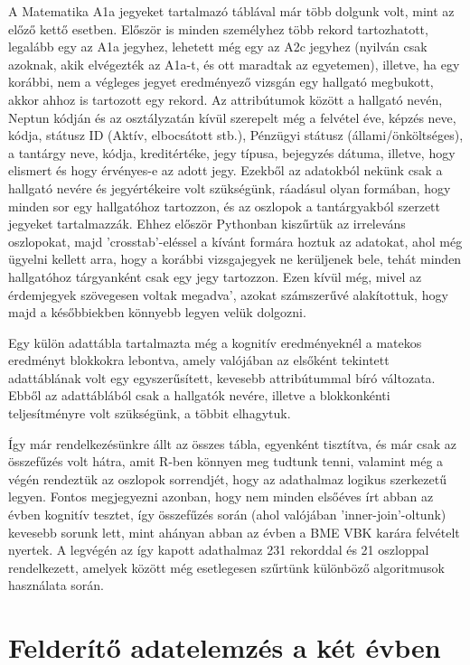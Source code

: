 \documentclass[12pt]{article}
\begin{document}
A Matematika A1a jegyeket tartalmazó táblával már több dolgunk volt, mint az előző kettő esetben. Először is minden személyhez több rekord tartozhatott, legalább egy az A1a jegyhez, lehetett még egy az A2c jegyhez (nyilván csak azoknak, akik elvégezték az A1a-t, és ott maradtak az egyetemen), illetve, ha egy korábbi, nem a végleges jegyet eredményező vizsgán egy hallgató megbukott, akkor ahhoz is tartozott egy rekord. Az attribútumok között a hallgató nevén, Neptun kódján és az osztályzatán kívül szerepelt még a felvétel éve, képzés neve, kódja, státusz ID (Aktív, elbocsátott stb.), Pénzügyi státusz (állami/önköltséges), a tantárgy neve, kódja, kreditértéke, jegy típusa, bejegyzés dátuma, illetve, hogy elismert és hogy érvényes-e az adott jegy. Ezekből az adatokból nekünk csak a hallgató nevére és jegyértékeire volt szükségünk, ráadásul olyan formában, hogy minden sor egy hallgatóhoz tartozzon, és az oszlopok a tantárgyakból szerzett jegyeket tartalmazzák. Ehhez először Pythonban kiszűrtük az irreleváns oszlopokat, majd ’crosstab’-eléssel a kívánt formára hoztuk az adatokat, ahol még ügyelni kellett arra, hogy a korábbi vizsgajegyek ne kerüljenek bele, tehát minden hallgatóhoz tárgyanként csak egy jegy tartozzon. Ezen kívül még, mivel az érdemjegyek szövegesen voltak megadva’, azokat számszerűvé alakítottuk, hogy majd a későbbiekben könnyebb legyen velük dolgozni.

Egy külön adattábla tartalmazta még a kognitív eredményeknél a matekos eredményt blokkokra lebontva, amely valójában az elsőként tekintett adattáblának volt egy egyszerűsített, kevesebb attribútummal bíró változata. Ebből az adattáblából csak a hallgatók nevére, illetve a blokkonkénti teljesítményre volt szükségünk, a többit elhagytuk.

Így már rendelkezésünkre állt az összes tábla, egyenként tisztítva, és már csak az összefűzés volt hátra, amit R-ben könnyen meg tudtunk tenni, valamint még a végén rendeztük az oszlopok sorrendjét, hogy az adathalmaz logikus szerkezetű legyen. Fontos megjegyezni azonban, hogy nem minden elsőéves írt abban az évben kognitív tesztet, így összefűzés során (ahol valójában ’inner-join’-oltunk) kevesebb sorunk lett, mint ahányan abban az évben a BME VBK karára felvételt nyertek.
A legvégén az így kapott adathalmaz 231 rekorddal és 21 oszloppal rendelkezett, amelyek között még esetlegesen szűrtünk különböző algoritmusok használata során.


\section{Felderítő adatelemzés a két évben}
\end{document}
